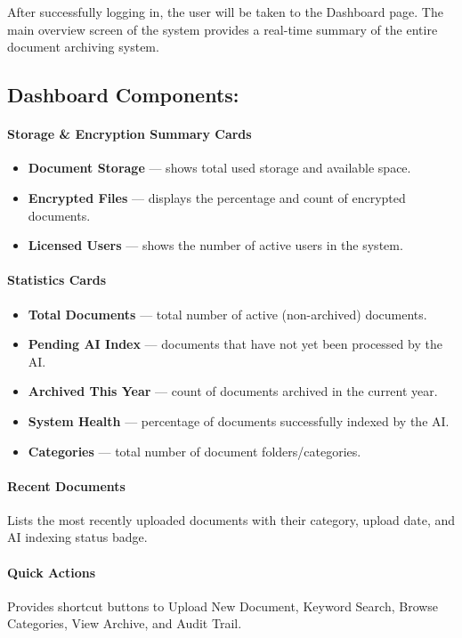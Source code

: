 After successfully logging in, the user will be taken to the Dashboard page. The main overview screen of the system provides a real-time summary of the entire document archiving system.

\subsection*{Dashboard Components:}

\paragraph{Storage \& Encryption Summary Cards}
\begin{itemize}
    \item \textbf{Document Storage} --- shows total used storage and available space.
    \item \textbf{Encrypted Files} --- displays the percentage and count of encrypted documents.
    \item \textbf{Licensed Users} --- shows the number of active users in the system.
\end{itemize}

\paragraph{Statistics Cards}
\begin{itemize}
    \item \textbf{Total Documents} --- total number of active (non-archived) documents.
    \item \textbf{Pending AI Index} --- documents that have not yet been processed by the AI.
    \item \textbf{Archived This Year} --- count of documents archived in the current year.
    \item \textbf{System Health} --- percentage of documents successfully indexed by the AI.
    \item \textbf{Categories} --- total number of document folders/categories.
\end{itemize}

\paragraph{Recent Documents}
Lists the most recently uploaded documents with their category, upload date, and AI indexing status badge.

\paragraph{Quick Actions}
Provides shortcut buttons to Upload New Document, Keyword Search, Browse Categories, View Archive, and Audit Trail.


